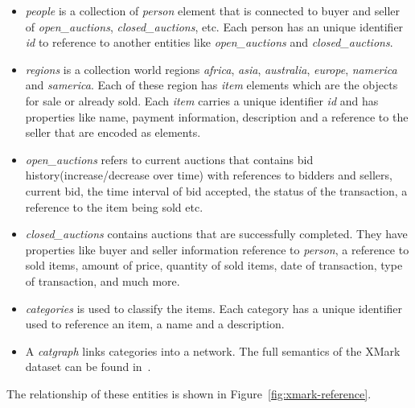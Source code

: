 \begin{itemize}	
	\item
	\textit{people} is a collection of \textit{person} element that is connected to buyer and seller of \textit{open\_auctions}, \textit{closed\_auctions}, etc. Each person has an unique identifier \textit{id} to reference to another entities like \textit{open\_auctions} and \textit{closed\_auctions}.
	\item
	\textit{regions} is a collection world regions \textit{africa}, \textit{asia}, \textit{australia}, \textit{europe}, \textit{namerica} and \textit{samerica}. Each of these region has \textit{item} elements which are the objects for sale or already sold. Each \textit{item} carries a unique identifier \textit{id} and has properties like name, payment information, description and a reference to the seller that are encoded as elements. 
	\item
		\textit{open\_auctions} refers to current auctions that contains bid history(increase/decrease over time) with references to bidders and sellers, current bid, the time interval of bid accepted, the status of the transaction, a reference to the item being sold etc.
	\item
		\textit{closed\_auctions} contains auctions that are successfully completed. They have properties like buyer and seller information reference to \textit{person}, a reference to sold items, amount of price, quantity of sold items, date of transaction, type of transaction, and much more.
	\item 
		\textit{categories} is used to classify the items. Each category has a unique identifier used to reference an item, a name and a description.
	\item
		  A \textit{catgraph} links categories into a network.  The full semantics of the XMark dataset can be found in~\cite{xmark/original}.
\end{itemize}
The relationship of these entities is shown in Figure~\ref{fig:xmark-reference}. 

